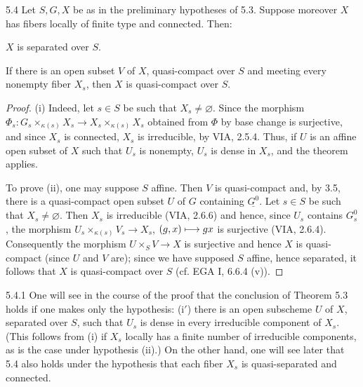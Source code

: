 \begin{corollary}{5.4}\label{VIB.5.4}
Let $S,G,X$ be as in the preliminary hypotheses of 5.3. Suppose moreover $X$ has fibers locally of finite type and connected. Then:
\begin{enumeratei}
\item $X$ is separated over $S$.
\item If there is an open subset $V$ of $X$, quasi-compact over $S$ and meeting every nonempty fiber $X_s$, then $X$ is quasi-compact over $S$.
\end{enumeratei}
\end{corollary}
\begin{proof}
(i) Indeed, let $s\in S$ be such that $X_s\ne\varnothing$. Since the morphism $\Phi_s:G_s\times_{\kappa(s)}X_s\to X_s\times_{\kappa(s)}X_s$ obtained from $\Phi$ by base change is surjective, and since $X_s$ is connected, $X_s$ is irreducible, by VIA, 2.5.4. Thus, if $U$ is an affine open subset of $X$ such that $U_s$ is nonempty, $U_s$ is dense in $X_s$, and the theorem applies.

To prove (ii), one may suppose $S$ affine. Then $V$ is quasi-compact and, by 3.5, there is a quasi-compact open subset $U$ of $G$ containing $\underline{G^0}$. Let $s\in S$ be such that $X_s\ne\varnothing$. Then $X_s$ is irreducible (VIA, 2.6.6) and hence, since $U_s$ contains $G_s^0$, the morphism $U_s\times_{\kappa(s)}V_s\to X_s$, $(g,x)\longmapsto gx$ is surjective (VIA, 2.6.4). Consequently the morphism $U\times_SV\to X$ is surjective and hence $X$ is quasi-compact (since $U$ and $V$ are); since we have supposed $S$ affine, hence separated, it follows that $X$ is quasi-compact over $S$ (cf. EGA I, 6.6.4 (v)).
\end{proof}
\begin{remark}{5.4.1}\label{VIB.5.4.1}
One will see in the course of the proof that the conclusion of Theorem 5.3 holds if one makes only the hypothesis: (i$'$) there is an open subscheme $U$ of $X$, separated over $S$, such that $U_s$ is dense in every irreducible component of $X_s$. (This follows from (i) if $X_s$ locally has a finite number of irreducible components, as is the case under hypothesis (ii).) On the other hand, one will see later that 5.4 also holds under the hypothesis that each fiber $X_s$ is quasi-separated and connected.
\end{remark}
